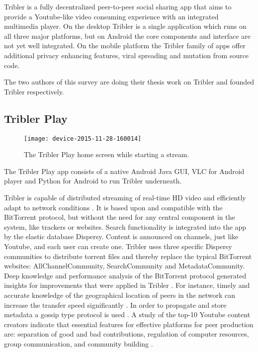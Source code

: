 \documentclass[conference,compsoc]{IEEEtran}
\begin{document}
Tribler is a fully decentralized peer-to-peer social sharing app that aims to provide a Youtube-like video consuming experience with an integrated multimedia player.
On the desktop Tribler is a single application which runs on all three major platforms, but on Android the core components and interface are not yet well integrated.
On the mobile platform the Tribler family of apps offer additional privacy enhancing features, viral spreading and mutation from source code.

The two authors of this survey are doing their thesis work on Tribler and founded Tribler respectively.

\subsection{Tribler Play}

\begin{figure}[b!]
\centering
\texttt{[image: device-2015-11-28-160014]}
\caption{The Tribler Play home screen while starting a stream.}
\label{fig_triblerplay}
\end{figure}

The Tribler Play app consists of a native Android Java GUI, VLC for Android player and Python for Android to run Tribler underneath. \cite{tribler2014play}

Tribler is capable of distributed streaming of real-time HD video and efficiently adapt to network conditions \cite{Pouwelse:2004b, pcs2004}.
It is based upon and compatible with the BitTorrent protocol, but without the need for any central component in the system, like trackers or websites.
Search functionality is integrated into the app by the elastic database Dispersy.
Content is announced on channels, just like Youtube, and each user can create one.
Tribler uses three specific Dispersy communities to distribute torrent files and thereby replace the typical BitTorrent websites: AllChannelCommunity, SearchCommunity and MetadataCommunity.
Deep knowledge and performance analysis of the BitTorrent protocol generated insights for improvements that were applied in Tribler \cite{Pouwelse:2004, iptps2005, aiosup05bittorrent, WeticeBitCrunch}.
For instance, timely and accurate knowledge of the geographical location of peers in the network can increase the transfer speed significantly \cite{aiosup05geo}.
In order to propagate and store metadata a gossip type protocol is used \cite{Wang:SIGIR2007, votecast}.
A study of the top-10 Youtube content creators indicate that essential features for effective platforms for peer production are: separation of good and bad contributions, regulation of computer resources, group communication, and community building \cite{telcom-policy-2008}.
\end{document}
